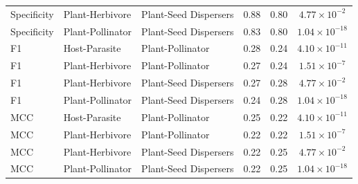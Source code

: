 \documentclass[oneside, a4paper, onecolumn, 11pt]{article}
\begin{document}
\begin{refsection}
\begin{table}[ht]
\begin{tabular}{|l|l|l|c|c|c|}
        Specificity & Plant-Herbivore & Plant-Seed Dispersers & 0.88 & 0.80 & $4.77 \times 10^{-2}$ \\
        Specificity & Plant-Pollinator & Plant-Seed Dispersers & 0.83 & 0.80 & $1.04 \times 10^{-18}$ \\
        F1 & Host-Parasite & Plant-Pollinator & 0.28 & 0.24 & $4.10 \times 10^{-11}$ \\
        F1 & Plant-Herbivore & Plant-Pollinator & 0.27 & 0.24 & $1.51 \times 10^{-7}$ \\
        F1 & Plant-Herbivore & Plant-Seed Dispersers & 0.27 & 0.28 & $4.77 \times 10^{-2}$ \\
        F1 & Plant-Pollinator & Plant-Seed Dispersers & 0.24 & 0.28 & $1.04 \times 10^{-18}$ \\
        MCC & Host-Parasite & Plant-Pollinator & 0.25 & 0.22 & $4.10 \times 10^{-11}$ \\
        MCC & Plant-Herbivore & Plant-Pollinator & 0.22 & 0.22 & $1.51 \times 10^{-7}$ \\
        MCC & Plant-Herbivore & Plant-Seed Dispersers & 0.22 & 0.25 & $4.77 \times 10^{-2}$ \\
        MCC & Plant-Pollinator & Plant-Seed Dispersers & 0.22 & 0.25 & $1.04 \times 10^{-18}$ \\
        \hline
    \end{tabular}
    \label{tab:SI_KW_communities_Dunn}
\end{table}



\end{refsection}
\end{document}
